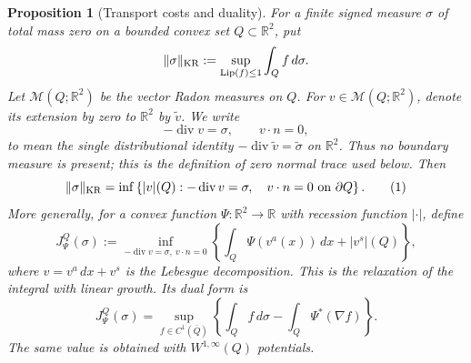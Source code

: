 \documentclass{smfart}
\newtheorem{proposition}[theorem]{Proposition}
\theoremstyle{definition}
\newcommand{\1}{\mathbf 1}
\begin{document}
\begin{proposition}[Transport costs and duality]\label{def:kr-beckmann}
For a finite signed measure $\sigma$ of total mass zero on a bounded convex
set $Q\subset\mathbb R^2$, put
\begin{equation*}
\|\sigma\|_ {\rm KR}
:=\sup_ {\operatorname {Lip}(f)\leq1}\int_ Q f\,d\sigma .
\end{equation*}
Let $\mathcal M(Q;\mathbb R^2)$ be the vector Radon measures on
$Q$.  For $v\in\mathcal M(Q;\mathbb R^2)$, denote its extension by
zero to $\mathbb R^2$ by $\widetilde v$.  We write
\begin{equation*}
-\operatorname {div}v=\sigma,\qquad v\cdot n=0,
\end{equation*}
to mean the single distributional identity
$-\operatorname {div}\widetilde v=\widetilde\sigma$ on
$\mathbb R^2$.  Thus no boundary measure is present; this is the
definition of zero normal trace used below.  Then
\begin{equation}
\|\sigma\|_ {\rm KR}
=\inf\left\{|v|(Q):
-\operatorname {div}v=\sigma,\quad v\cdot n=0\text{ on }\partial Q
\right\}.
\tag{1}
\end{equation}
More generally, for a convex function $\Psi:\mathbb R^2\to\mathbb R$
with recession function $|\cdot|$, define
\begin{equation*}
J^Q_ \Psi(\sigma)
:=\inf_ {-\operatorname {div}v=\sigma,\ v\cdot n=0}
\left\{\int_ Q\Psi(v^a(x))\,dx+|v^s|(Q)\right\},
\end{equation*}
where $v=v^a\,dx+v^s$ is the Lebesgue decomposition.  This is the
relaxation of the integral with linear growth.
Its dual form is
\begin{equation}
J^Q_ \Psi(\sigma)
=\sup_ {f\in C^1(\overline Q)}
\left\{\int_ Q f\,d\sigma-\int_ Q\Psi^*(\nabla f)\right\}.
\tag{2}
\end{equation}
The same value is obtained with $W^{1,\infty}(Q)$ potentials.

\end{proposition}
\end{document}
